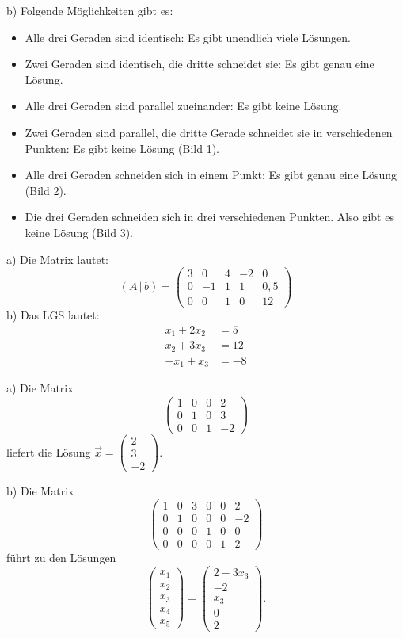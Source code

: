 b) Folgende Möglichkeiten gibt es:
\begin{itemize}
  \item Alle drei Geraden sind identisch: Es gibt unendlich viele Lösungen.
  \item Zwei Geraden sind identisch, die dritte schneidet sie: Es gibt genau eine Lösung.
  \item Alle drei Geraden sind parallel zueinander: Es gibt keine Lösung.
  \item Zwei Geraden sind parallel, die dritte Gerade schneidet sie in verschiedenen Punkten: Es gibt keine Lösung (Bild 1).
  \item Alle drei Geraden schneiden sich in einem Punkt: Es gibt genau eine Lösung (Bild 2).
  \item Die drei Geraden schneiden sich in drei verschiedenen Punkten. Also gibt es keine Lösung (Bild 3).
\end{itemize}

a) Die Matrix lautet:
\[ (A\,|\,b) = \left(\begin{array}{cccc|c} 3 & 0 & 4 & -2 & 0\\ 0 & -1 & 1 & 1 & 0{,}5\\ 0 & 0 & 1 & 0 & 12 \end{array}\right) \]
b) Das LGS lautet:
\begin{align*}
  x_1 + 2x_2 &= 5\\
  x_2 + 3x_3 &= 12\\
  -x_1 + x_3 &= -8
\end{align*}

a) Die Matrix
\[ \left(\begin{array}{ccc|c} 1 & 0 & 0 & 2\\ 0 & 1 & 0 & 3\\ 0 & 0 & 1 & -2 \end{array}\right) \]
liefert die Lösung $\vec{x} = \begin{pmatrix} 2 \\ 3 \\ -2 \end{pmatrix}$.

b) Die Matrix
\[ \left(\begin{array}{ccccc|c} 1 & 0 & 3 & 0 & 0 & 2\\ 0 & 1 & 0 & 0 & 0 & -2\\ 0 & 0 & 0 & 1 & 0 & 0\\ 0 & 0 & 0 & 0 & 1 & 2 \end{array}\right) \]
führt zu den Lösungen
\[ \begin{pmatrix} x_1 \\ x_2 \\ x_3 \\ x_4 \\ x_5 \end{pmatrix} = \begin{pmatrix} 2 - 3x_3 \\ -2 \\ x_3 \\ 0 \\ 2 \end{pmatrix} . \]

